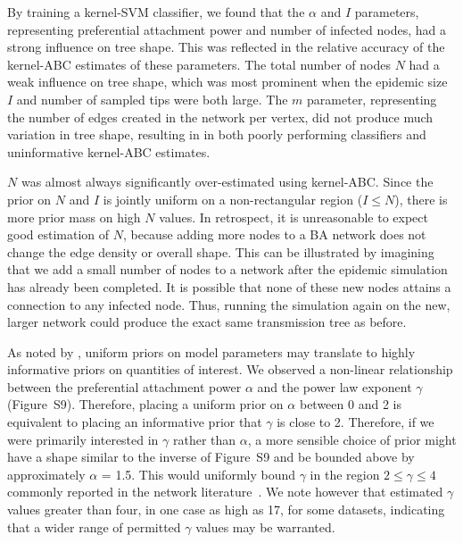 \documentclass[nogrid]{MBE}
\begin{document}
By training a kernel-SVM classifier, we found that the $\alpha$ and $I$
parameters, representing preferential attachment power and number of infected
nodes, had a strong influence on tree shape. This was reflected in the relative
accuracy of the kernel-ABC estimates of these parameters. The total number of
nodes $N$ had a weak influence on tree shape, which was most prominent when the
epidemic size $I$ and number of sampled tips were both large. The $m$
parameter, representing the number of edges created in the network per vertex,
did not produce much variation in tree shape, resulting in in both poorly
performing classifiers and uninformative kernel-ABC estimates.

$N$ was almost always significantly over-estimated using kernel-ABC. Since the
prior on $N$ and $I$ is jointly uniform on a non-rectangular region ($I \leq
N$), there is more prior mass on high $N$ values. In retrospect, it is
unreasonable to expect good estimation of $N$, because adding more nodes to a
BA network does not change the edge density or overall shape. This can be
illustrated by imagining that we add a small number of nodes to a network after
the epidemic simulation has already been completed. It is possible that none of
these new nodes attains a connection to any infected node. Thus, running the
simulation again on the new, larger network could produce the exact same
transmission tree as before. 

As noted by \citet{lintusaari2016identifiability}, uniform priors on model
parameters may translate to highly informative priors on quantities of
interest. We observed a non-linear relationship between the preferential
attachment power $\alpha$ and the power law exponent $\gamma$ (Figure~S9).
Therefore, placing a uniform prior on $\alpha$ between 0 and 2 is equivalent to
placing an informative prior that $\gamma$ is close to 2. Therefore, if we were
primarily interested in $\gamma$ rather than $\alpha$, a more sensible choice
of prior might have a shape similar to the inverse of Figure~S9 and be bounded
above by approximately $\alpha$ = 1.5. This would uniformly bound $\gamma$ in
the region $2 \leq \gamma \leq 4$ commonly reported in the network
literature~\citep{liljeros2001web, schneeberger2004scale, colgate1989risk,
brown2011transmission}. We note however that \citet{jones2003assessment}
estimated $\gamma$ values greater than four, in one case as high as 17, for
some datasets, indicating that a wider range of permitted $\gamma$ values may
be warranted.
\end{document}
